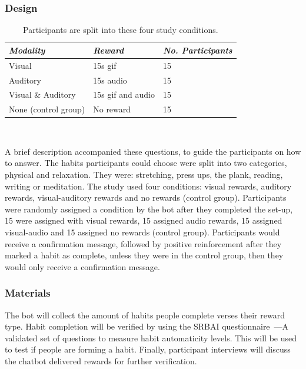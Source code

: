 \documentclass{scaffold/sigchi}
\begin{document}
\subsubsection{Design}


\begin{table}
  \centering
  \begin{tabular}{l l l}
    {\small\textit{Modality}} & {\small \textit{Reward}} & {\small \textit{No. Participants}}\\
    \midrule
    Visual & 15s gif & 15 \\
    Auditory & 15s audio & 15 \\
    Visual \& Auditory & 15s gif and audio & 15 \\
    None (control group) & No reward & 15 \\
  \end{tabular}
  \caption{Participants are split into these four study conditions.}~\label{tab:precise_rewards}
\end{table}

A brief description accompanied these questions, to guide the participants on how to answer. The habits participants could choose were split into two categories, physical and relaxation. They were: stretching, press ups, the plank, reading, writing or meditation.\newline
\newline
The study used four conditions: visual rewards, auditory rewards, visual-auditory rewards and no rewards (control group). Participants were randomly assigned a condition by the bot after they completed the set-up, 15 were assigned with visual rewards, 15 assigned audio rewards, 15 assigned visual-audio and 15 assigned no rewards (control group).\newline
\newline
Participants would receive a confirmation message, followed by positive reinforcement after they marked a habit as complete, unless they were in the control group, then they would only receive a confirmation message.


\subsubsection{Materials}
The bot will collect the amount of habits people complete verses their reward type. Habit completion will be verified by using the SRBAI questionnaire~\cite{article_habit_measurement}---A validated set of questions to measure habit automaticity levels. This will be used to test if people are forming a habit. Finally, participant interviews will discuss the chatbot delivered rewards for further verification.
\end{document}
